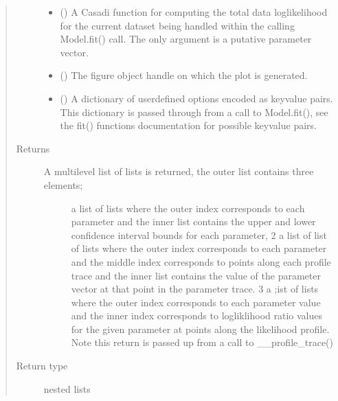 \documentclass[letterpaper,10pt,english,openany,oneside]{sphinxmanual}
\begin{document}
\begin{fulllineitems}
\begin{fulllineitems}
\begin{quote}
\begin{description}
\begin{itemize}
\item {} 
 () \textendash{} A Casadi function for computing the total data log\sphinxhyphen{}likelihood
for the current dataset being handled within the calling Model.fit() call. The only
argument is a putative parameter vector.

\item {} 
 () \textendash{} The figure object handle on which the plot is generated.

\item {} 
 () \textendash{} A dictionary of user\sphinxhyphen{}defined options encoded as key\sphinxhyphen{}value
pairs. This dictionary is passed through from a call to Model.fit(), see
the fit() functions documentation for possible key\sphinxhyphen{}value pairs.

\end{itemize}

\item[{Returns}] \leavevmode
\begin{description}
\item[{A multi\sphinxhyphen{}level list of lists is returned, the outer list contains three elements;}]  \sphinxhyphen{} a list of lists where the outer index corresponds to each parameter and the
inner list contains the upper and lower confidence interval bounds for each parameter,
2 \sphinxhyphen{} a list of list of lists where the outer index corresponds to each parameter and
the middle index corresponds to points along each profile trace and the inner list
contains the value of the parameter vector at that point in the parameter trace.
3 \sphinxhyphen{} a ;ist of lists where the outer index corresponds to each parameter value and
the inner index corresponds to logliklihood ratio values for the given parameter
at points along the likelihood profile. Note this return is passed up from a call
to \_\_profile\_trace()

\end{description}


\item[{Return type}] \leavevmode
nested lists

\end{description}\end{quote}


\end{fulllineitems}
\end{fulllineitems}
\end{document}
